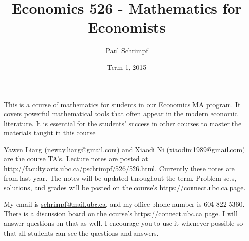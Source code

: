 \documentclass[10pt]{article}
\title{Economics 526 - Mathematics for Economists}
\date{Term 1, 2015}
\author{Paul Schrimpf}
\begin{document}
\maketitle

This is a course of mathematics for students in our Economics MA
program. It covers powerful mathematical tools that often appear
in the modern economic literature. It is essential for the students'
success in other courses to master the materials taught in this
course.

Yawen Liang (neway.liang@gmail.com) and Xiaodi Ni (xiaodini1989@gmail.com)
are the course TA's.  Lecture notes are posted
at \url{http://faculty.arts.ubc.ca/pschrimpf/526/526.html}. Currently
these notes are from last year. The notes will be updated throughout
the term. Problem sets, solutions, and grades will be posted on the
course's \url{https://connect.ubc.ca} page.

My email is
\href{mailto:schrimp@mail.ubc.ca}{schrimpf@mail.ubc.ca}, and my office
phone number is 604-822-5360. There is a discussion board on the
course's \url{https://connect.ubc.ca} page. I will answer questions on
that as well. I encourage you to use it whenever possible so that
all students can see the questions and answers.
\end{document}
